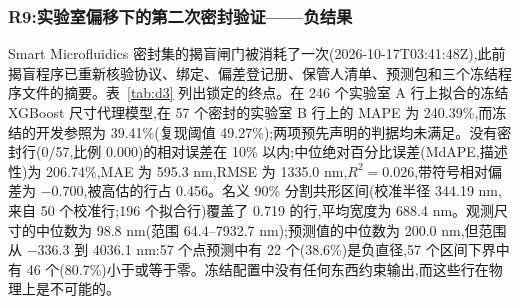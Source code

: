 \documentclass[11pt,a4paper]{ctexart}
\begin{document}
\begin{table}[t]
\centering\small
\caption{参考 XGBoost 模型的协变量偏移加权分割共形(冻结的 W5 协议;各重复的均值;两次运行逐字节相同)。“Cov.”将无穷区间计为覆盖;“inf.”为无穷区间所占比例;“fin. cov.”与“width”仅针对有限区间;ESS 为校准权重的有效样本量除以校准集大小:它描述的是校准权重彼此之间的均匀程度,而不是测试点权重相对于校准集的比值,因此在 ESS 接近 1 时区间仍可能为无穷(测试点权重份额超过 $1-0.90$),如 D1 SE$\to$DE。破折号:每个区间均为无穷。列分组:未加权;域分类器几率(Domain-classifier odds);$k$-NN 密度比。}
\label{tab:w5}
\end{table}

\subsubsection{R9:实验室偏移下的第二次密封验证——负结果}
\label{sec:r9}

Smart Microfluidics 密封集的揭盲闸门被消耗了一次(2026-10-17T03:41:48Z),此前揭盲程序已重新核验协议、绑定、偏差登记册、保管人清单、预测包和三个冻结程序文件的摘要。表~\ref{tab:d3} 列出锁定的终点。在 246 个实验室 A 行上拟合的冻结 XGBoost 尺寸代理模型,在 57 个密封的实验室 B 行上的 MAPE 为 240.39\%,而冻结的开发参照为 39.41\%(复现阈值 49.27\%);两项预先声明的判据均未满足。没有密封行(0/57,比例 0.000)的相对误差在 10\% 以内;中位绝对百分比误差(MdAPE,描述性)为 206.74\%,MAE 为 595.3 nm,RMSE 为 1335.0 nm,$R^2=0.026$,带符号相对偏差为 $-0.700$,被高估的行占 0.456。名义 90\% 分割共形区间(校准半径 344.19 nm,来自 50 个校准行;196 个拟合行)覆盖了 0.719 的行,平均宽度为 688.4 nm。观测尺寸的中位数为 98.8 nm(范围 64.4–7932.7 nm);预测值的中位数为 200.0 nm,但范围从 $-336.3$ 到 4036.1 nm:57 个点预测中有 22 个(38.6\%)是负直径,57 个区间下界中有 46 个(80.7\%)小于或等于零。冻结配置中没有任何东西约束输出,而这些行在物理上是不可能的。
\end{document}
